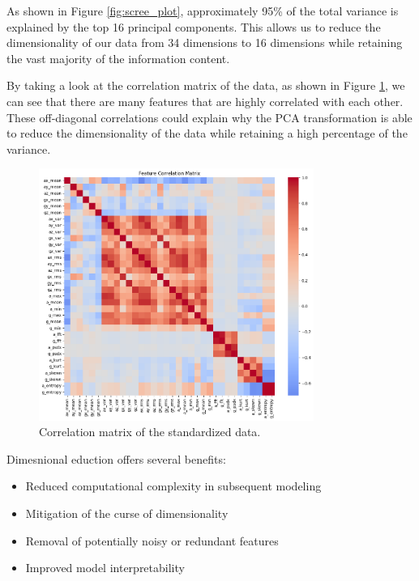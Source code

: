\documentclass[12pt]{article}
\begin{document}
As shown in Figure \ref{fig:scree_plot}, approximately 95\% of the total variance is explained by the top 16 principal components. This allows us to reduce the dimensionality of our data from 34 dimensions to 16 dimensions while retaining the vast majority of the information content. 

\vspace{10pt}

By taking a look at the correlation matrix of the data, as shown in Figure \ref{fig:correlation_matrix}, we can see that there are many features that are highly correlated with each other. These off-diagonal correlations could explain why the PCA transformation is able to reduce the dimensionality of the data while retaining a high percentage of the variance.

\begin{figure}[H]
\centering
\includegraphics[width=0.8\textwidth]{figures/correlation_matrix.png}
\caption{Correlation matrix of the standardized data.}
\label{fig:correlation_matrix}
\end{figure}

Dimesnional eduction offers several benefits:

\begin{itemize}
    \item Reduced computational complexity in subsequent modeling
    \item Mitigation of the curse of dimensionality
    \item Removal of potentially noisy or redundant features
    \item Improved model interpretability
\end{itemize}
\end{document}
